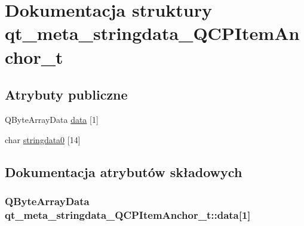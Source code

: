 \hypertarget{structqt__meta__stringdata___q_c_p_item_anchor__t}{}\section{Dokumentacja struktury qt\+\_\+meta\+\_\+stringdata\+\_\+\+Q\+C\+P\+Item\+Anchor\+\_\+t}
\label{structqt__meta__stringdata___q_c_p_item_anchor__t}
\subsection*{Atrybuty publiczne}
\begin{DoxyCompactItemize}
\item 
Q\+Byte\+Array\+Data \hyperlink{structqt__meta__stringdata___q_c_p_item_anchor__t_ab593c041f966a8f093e032b5b552399d}{data} \mbox{[}1\mbox{]}
\item 
char \hyperlink{structqt__meta__stringdata___q_c_p_item_anchor__t_aafbba7dee657bf2d44a9148e9e2c6b48}{stringdata0} \mbox{[}14\mbox{]}
\end{DoxyCompactItemize}


\subsection{Dokumentacja atrybutów składowych}
\subsubsection[{\texorpdfstring{data}{data}}]{\setlength{\rightskip}{0pt plus 5cm}Q\+Byte\+Array\+Data qt\+\_\+meta\+\_\+stringdata\+\_\+\+Q\+C\+P\+Item\+Anchor\+\_\+t\+::data\mbox{[}1\mbox{]}}\hypertarget{structqt__meta__stringdata___q_c_p_item_anchor__t_ab593c041f966a8f093e032b5b552399d}{}\label{structqt__meta__stringdata___q_c_p_item_anchor__t_ab593c041f966a8f093e032b5b552399d}
